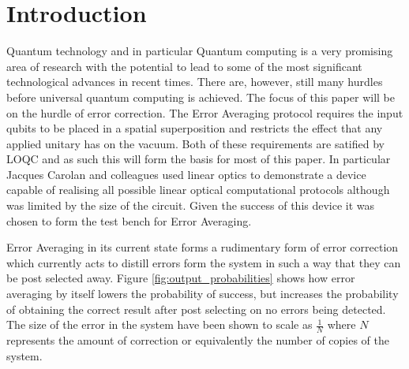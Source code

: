 \documentclass[aps,pra,twocolumn,superscriptaddress,numerical]{revtex4-1}
\begin{document}
\pacs{}

\maketitle

\section{Introduction \label{intro}}
Quantum technology and in particular Quantum computing is a very promising area of research with the potential to lead to some of the most significant technological advances in recent times. There are, however, still many hurdles before universal quantum computing is achieved. The focus of this paper will be on the hurdle of error correction. The Error Averaging protocol requires the input qubits to be placed in a spatial superposition and restricts the effect that any applied unitary has on the vacuum. Both of these requirements are satified by LOQC and as such this will form the basis for most of this paper. In particular Jacques Carolan and colleagues \cite{ULO} used linear optics to demonstrate a device capable of realising all possible linear optical computational protocols although was limited by the size of the circuit. Given the success of this device it was chosen to form the test bench for Error Averaging.

Error Averaging in its current state forms a rudimentary form of error correction which currently acts to distill errors form the system in such a way that they can be post selected away. Figure \ref{fig:output_probabilities} shows how error averaging by itself lowers the probability of success, but increases the probability of obtaining the correct result after post selecting on no errors being detected. The size of the error in the system have been shown to scale as $\frac{1}{N}$ where $N$ represents the amount of correction or equivalently the number of copies of the system.
\end{document}
